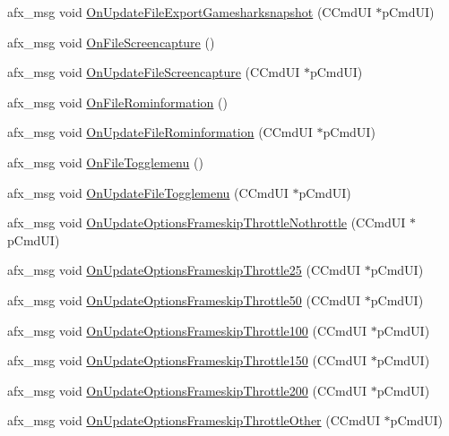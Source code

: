 \begin{DoxyCompactItemize}
\item 
afx\+\_\+msg void \mbox{\hyperlink{class_main_wnd_a2ec36732add704ab58b3c2a05e336d3b}{On\+Update\+File\+Export\+Gamesharksnapshot}} (C\+Cmd\+UI $\ast$p\+Cmd\+UI)
\item 
afx\+\_\+msg void \mbox{\hyperlink{class_main_wnd_a869b47c3aae70c534109b9a8310e1faf}{On\+File\+Screencapture}} ()
\item 
afx\+\_\+msg void \mbox{\hyperlink{class_main_wnd_a5b9a0551c29d223054e314f8018e0ab9}{On\+Update\+File\+Screencapture}} (C\+Cmd\+UI $\ast$p\+Cmd\+UI)
\item 
afx\+\_\+msg void \mbox{\hyperlink{class_main_wnd_a81e882a9db84a84f2507a63161b5bc4c}{On\+File\+Rominformation}} ()
\item 
afx\+\_\+msg void \mbox{\hyperlink{class_main_wnd_ad95c3d153c3dc0faac385a6b765853c8}{On\+Update\+File\+Rominformation}} (C\+Cmd\+UI $\ast$p\+Cmd\+UI)
\item 
afx\+\_\+msg void \mbox{\hyperlink{class_main_wnd_ad376d27bd5299961827dda9d8700a375}{On\+File\+Togglemenu}} ()
\item 
afx\+\_\+msg void \mbox{\hyperlink{class_main_wnd_aa5c872c99d1d656c74971eb67f4a2b97}{On\+Update\+File\+Togglemenu}} (C\+Cmd\+UI $\ast$p\+Cmd\+UI)
\item 
afx\+\_\+msg void \mbox{\hyperlink{class_main_wnd_a257268a463135c72751be8111df48fae}{On\+Update\+Options\+Frameskip\+Throttle\+Nothrottle}} (C\+Cmd\+UI $\ast$p\+Cmd\+UI)
\item 
afx\+\_\+msg void \mbox{\hyperlink{class_main_wnd_ac92a00f1057a61ae756c93004fb42938}{On\+Update\+Options\+Frameskip\+Throttle25}} (C\+Cmd\+UI $\ast$p\+Cmd\+UI)
\item 
afx\+\_\+msg void \mbox{\hyperlink{class_main_wnd_a1a3e6740086e386c8953eed9c59d005d}{On\+Update\+Options\+Frameskip\+Throttle50}} (C\+Cmd\+UI $\ast$p\+Cmd\+UI)
\item 
afx\+\_\+msg void \mbox{\hyperlink{class_main_wnd_adb8330ee73130cb9c4dd676a9da387b9}{On\+Update\+Options\+Frameskip\+Throttle100}} (C\+Cmd\+UI $\ast$p\+Cmd\+UI)
\item 
afx\+\_\+msg void \mbox{\hyperlink{class_main_wnd_a22dde850fc137ea95bd63898d35086d1}{On\+Update\+Options\+Frameskip\+Throttle150}} (C\+Cmd\+UI $\ast$p\+Cmd\+UI)
\item 
afx\+\_\+msg void \mbox{\hyperlink{class_main_wnd_a1e2ba1a5a6a690c4a2cd946f9621dbd2}{On\+Update\+Options\+Frameskip\+Throttle200}} (C\+Cmd\+UI $\ast$p\+Cmd\+UI)
\item 
afx\+\_\+msg void \mbox{\hyperlink{class_main_wnd_a3d0b3623cc17e6a1f6855dff9106e737}{On\+Update\+Options\+Frameskip\+Throttle\+Other}} (C\+Cmd\+UI $\ast$p\+Cmd\+UI)

\end{DoxyCompactItemize}
